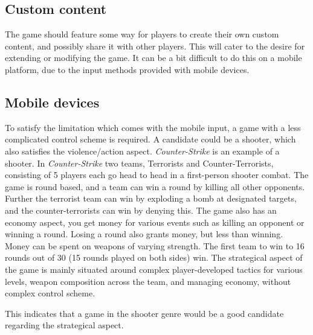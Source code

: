 \subsection{Custom content}
The game should feature some way for players to create their own custom content, and possibly share it with other players.
This will cater to the desire for extending or modifying the game.
It can be a bit difficult to do this on a mobile platform, due to the input methods provided with mobile devices.

\subsection{Mobile devices}\label{sec:selectionofgametype:mobiledevices}
To satisfy the limitation which comes with the mobile input, a game with a less complicated control scheme is required.
A candidate could be a shooter, which also satisfies the violence/action aspect.
\textit{Counter-Strike} is an example of a shooter. \cite{counterstrike}
In \textit{Counter-Strike} two teams, Terrorists and Counter-Terrorists, consisting of 5 players each go head to head in a first-person shooter combat. 
The game is round based, and a team can win a round by killing all other opponents. 
Further the terrorist team can win by exploding a bomb at designated targets, and the counter-terrorists can win by denying this. 
The game also has an economy aspect, you get money for various events such as killing an opponent or winning a round.
Losing a round also grants money, but less than winning.
Money can be spent on weapons of varying strength.
The first team to win to 16 rounds out of 30 (15 rounds played on both sides) win. 
The strategical aspect of the game is mainly situated around complex player-developed tactics for various levels, weapon composition across the team, and managing economy, without complex control scheme.

This indicates that a game in the shooter genre would be a good candidate regarding the strategical aspect.

